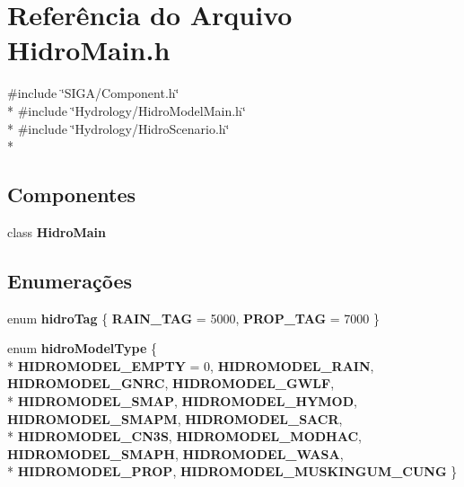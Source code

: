 \section{Referência do Arquivo Hidro\+Main.\+h}
\label{_hidro_main_8h}
{\ttfamily \#include \char`\"{}S\+I\+G\+A/\+Component.\+h\char`\"{}}\\*
{\ttfamily \#include \char`\"{}Hydrology/\+Hidro\+Model\+Main.\+h\char`\"{}}\\*
{\ttfamily \#include \char`\"{}Hydrology/\+Hidro\+Scenario.\+h\char`\"{}}\\*
\subsection*{Componentes}
\begin{DoxyCompactItemize}
\item 
class {\bf Hidro\+Main}
\end{DoxyCompactItemize}
\subsection*{Enumerações}
\begin{DoxyCompactItemize}
\item 
enum {\bf hidro\+Tag} \{ {\bf R\+A\+I\+N\+\_\+\+T\+AG} = 5000, 
{\bf P\+R\+O\+P\+\_\+\+T\+AG} = 7000
 \}
\item 
enum {\bf hidro\+Model\+Type} \{ \\*
{\bf H\+I\+D\+R\+O\+M\+O\+D\+E\+L\+\_\+\+E\+M\+P\+TY} = 0, 
{\bf H\+I\+D\+R\+O\+M\+O\+D\+E\+L\+\_\+\+R\+A\+IN}, 
{\bf H\+I\+D\+R\+O\+M\+O\+D\+E\+L\+\_\+\+G\+N\+RC}, 
{\bf H\+I\+D\+R\+O\+M\+O\+D\+E\+L\+\_\+\+G\+W\+LF}, 
\\*
{\bf H\+I\+D\+R\+O\+M\+O\+D\+E\+L\+\_\+\+S\+M\+AP}, 
{\bf H\+I\+D\+R\+O\+M\+O\+D\+E\+L\+\_\+\+H\+Y\+M\+OD}, 
{\bf H\+I\+D\+R\+O\+M\+O\+D\+E\+L\+\_\+\+S\+M\+A\+PM}, 
{\bf H\+I\+D\+R\+O\+M\+O\+D\+E\+L\+\_\+\+S\+A\+CR}, 
\\*
{\bf H\+I\+D\+R\+O\+M\+O\+D\+E\+L\+\_\+\+C\+N3S}, 
{\bf H\+I\+D\+R\+O\+M\+O\+D\+E\+L\+\_\+\+M\+O\+D\+H\+AC}, 
{\bf H\+I\+D\+R\+O\+M\+O\+D\+E\+L\+\_\+\+S\+M\+A\+PH}, 
{\bf H\+I\+D\+R\+O\+M\+O\+D\+E\+L\+\_\+\+W\+A\+SA}, 
\\*
{\bf H\+I\+D\+R\+O\+M\+O\+D\+E\+L\+\_\+\+P\+R\+OP}, 
{\bf H\+I\+D\+R\+O\+M\+O\+D\+E\+L\+\_\+\+M\+U\+S\+K\+I\+N\+G\+U\+M\+\_\+\+C\+U\+NG}
 \}
\end{DoxyCompactItemize}
